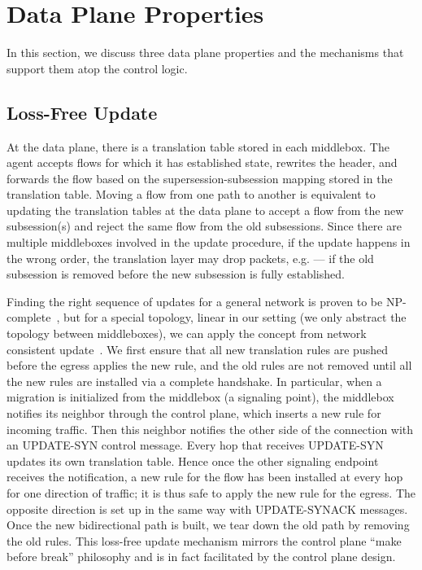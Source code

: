 
\section{Data Plane Properties}
In this section, we discuss three data plane properties and the mechanisms that support them atop the control logic. 

\subsection{Loss-Free Update}


At the data plane, there is a translation table stored in each middlebox. The \system agent accepts flows for which it has established state, rewrites the header, and forwards the flow based on the supersession-subsession mapping stored in the translation table. Moving a flow from one path to another is equivalent to updating the translation tables at the data plane to accept a flow from the new subsession(s) and reject the same flow from the old subsessions. Since there are multiple middleboxes involved in the update procedure, if the update happens in the wrong order, the translation layer may drop packets, e.g. --- if the old subsession is removed before the new subsession is fully established.


Finding the right sequence of updates for a general network is proven to be NP-complete~\cite{SWAN, zUpdate}, but for a special topology, linear in our setting (we only abstract the topology between middleboxes), we can apply the concept from network consistent update~\cite{consistentupdate, ratul}. We first ensure that all new translation rules are pushed before the egress applies the new rule, and the old rules are not removed until all the new rules are installed via a complete handshake. In particular, when a migration is initialized from the middlebox (a signaling point), the middlebox notifies its neighbor through the control plane, which inserts a new rule for incoming traffic. Then this neighbor notifies the other side of the connection with an UPDATE-SYN control message. Every hop that receives UPDATE-SYN updates its own translation table. Hence once the other signaling endpoint receives the notification, a new rule for the flow has been installed at every hop for one direction of traffic; it is thus safe to apply the new rule for the egress. The opposite direction is set up in the same way with UPDATE-SYNACK messages. Once the new bidirectional path is built, we tear down the old path by removing the old rules. This loss-free update mechanism mirrors the control plane ``make before break'' philosophy and is in fact facilitated by the control plane design. 

